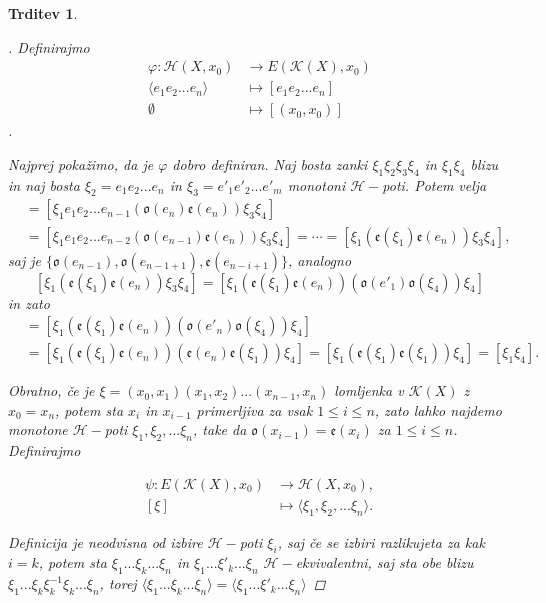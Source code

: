 \documentclass[a4paper,12pt]{article}
\DeclareRobustCommand{\k}{
    \mathcal{K}
}
\DeclareRobustCommand{\h}{
    \mathcal{H}
}
\theoremstyle{definition}
\theoremstyle{plain}
\theoremstyle{definition}
\theoremstyle{plain}
\newtheorem{trditev}{Trditev}
\theoremstyle{plain}
\theoremstyle{plain}
\theoremstyle{plain}
\newenvironment{dokaz}{\begin{proof}[\bfseries\upshape\proofname]}{\end{proof}}
\begin{document}
\begin{trditev}
\begin{dokaz}
    Definirajmo 
    \begin{align*}
\varphi:\mathscr{H}(X,x_0)&\rightarrow E(\k(X),x_0)\\
\langle e_1e_2...e_n\rangle&\mapsto [e_1e_2...e_n]\\
\emptyset &\mapsto [(x_0,x_0)]
    \end{align*}.

    Najprej pokažimo, da je $\varphi$ dobro definiran.
    Naj bosta zanki $\xi_1 \xi_2 \xi_3 \xi_4$ in $\xi_1 \xi_4 $ blizu in naj bosta $\xi_2 = e_1e_2...e_n$ in $\xi_3 = e'_1e'_2...e'_m$ monotoni $\h-$poti. Potem velja 
\begin{align*}
    [\xi_1 \xi_2 \xi_3 \xi_4]&=[\xi_1 e_1e_2...e_{n-1}(\mathfrak{o}(e_n)\mathfrak{e}(e_n)) \xi_3 \xi_4]\\
    &=[\xi_1 e_1e_2...e_{n-2}(\mathfrak{o}(e_{n-1})\mathfrak{e}(e_n)) \xi_3 \xi_4]=\cdots=[\xi_1(\mathfrak{e}(\xi_1)\mathfrak{e}(e_n)) \xi_3 \xi_4],
\end{align*}
saj je $\{\mathfrak{o}(e_{n-1}),\mathfrak{o}(e_{n-1+1}),\mathfrak{e}(e_{n-i+1})\}$, analogno 
$$
[\xi_1(\mathfrak{e}(\xi_1)\mathfrak{e}(e_n)) \xi_3 \xi_4]=[\xi_1(\mathfrak{e}(\xi_1)\mathfrak{e}(e_n))( \mathfrak{o}(e'_1)\mathfrak{o}(\xi_4)) \xi_4]
$$
in zato 
\begin{align*}
    [\xi_1 \xi_2 \xi_3 \xi_4]&=[\xi_1(\mathfrak{e}(\xi_1)\mathfrak{e}(e_n)) (\mathfrak{o}(e'_n)\mathfrak{o}(\xi_4)) \xi_4]\\
    &=[\xi_1(\mathfrak{e}(\xi_1)\mathfrak{e}(e_n)) (\mathfrak{e}(e_n)\mathfrak{e}(\xi_1)) \xi_4]=[\xi_1(\mathfrak{e}(\xi_1) \mathfrak{e}(\xi_1)) \xi_4]=[\xi_1 \xi_4].
\end{align*}


Obratno, če je $\xi =(x_0,x_1)(x_1,x_2)...(x_{n-1},x_n)$ lomljenka v $\k(X)$ z $x_0=x_n$, potem sta $x_i$ in $x_{i-1}$ primerljiva za vsak $1\leq i \leq n$, zato lahko najdemo monotone $\h-$poti $\xi_1, \xi_2,... \xi_n$, take da $\mathfrak{o}(x_{i-1})=\mathfrak{e}(x_i)$ za $1\leq i \leq n$. Definirajmo

\begin{align*}
    \psi: E(\k(X),x_0)&\rightarrow \mathscr{H}(X,x_0),\\
    [\xi]&\mapsto \langle\xi_1, \xi_2,... \xi_n\rangle.
\end{align*}

Definicija je neodvisna od izbire $\h-$poti $\xi_i$, saj če se izbiri razlikujeta za kak $i=k$, potem sta $\xi_1...\xi_k...\xi_n$ in $\xi_1...\xi'_k...\xi_n$ $\h-$ekvivalentni, saj sta obe blizu $\xi_1...\xi_k\xi_k^{-1}\xi_k...\xi_n$, torej $\langle \xi_1...\xi_k...\xi_n \rangle = \langle \xi_1...\xi'_k...\xi_n \rangle$


\end{dokaz}
\end{trditev}
\end{document}
